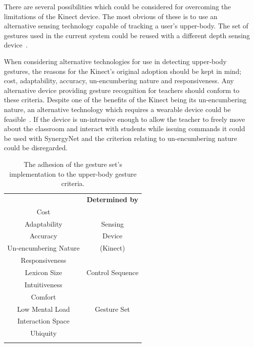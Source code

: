 \documentclass[link]{IWCOMP}
\begin{document}


There are several possibilities which could be considered for overcoming the limitations of the Kinect device.
The most obvious of these is to use an alternative sensing technology capable of tracking a user's upper-body.
The set of gestures used in the current system could be reused with a different depth sensing device~\cite{Kean2011}.

When considering alternative technologies for use in detecting upper-body gestures, the reasons for the Kinect's original adoption should be kept in mind; cost, adaptability, accuracy, un-encumbering nature and responsiveness.
Any alternative device providing gesture recognition for teachers should conform to these criteria.
Despite one of the benefits of the Kinect being its un-encumbering nature, an alternative technology which requires a wearable device could be feasible~\cite{Rekimotoa,Zhu2011}.
If the device is un-intrusive enough to allow the teacher to freely move about the classroom and interact with students while issuing commands it could be used with SynergyNet and the criterion relating to un-encumbering nature could be disregarded. 

\begin{table}[h]
   \begin{tabular}{!{\vrule width 1.5pt}c|c!{\vrule width 1.5pt}}
   &\textbf{Determined by} 	\\
   Cost 					& 					\\
   Adaptability 				&Sensing 			\\
   Accuracy 				&Device 				\\
   Un-encumbering Nature	&(Kinect) 			\\
   Responsiveness 			& 					\\
   Lexicon Size 				&Control Sequence 	\\
   Intuitiveness 			& 					\\
   Comfort 					& 					\\
   Low Mental Load 			&Gesture Set 		\\
   Interaction Space 		& 					\\
   Ubiquity 				& 					\\
   \end{tabular}
   \caption{The adhesion of the gesture set's implementation to the upper-body gesture criteria.}
   \label{table:criteria}
   \end{table}
   
\end{document}
